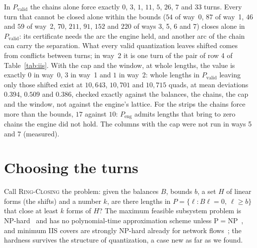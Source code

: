 \documentclass[11pt,a4paper]{article}
\newcommand{\RC}{\textup{\textsc{Ring-Closing}}}
\begin{document}
In $P_{\mathrm{valid}}$ the chains alone force exactly $0$, $3$, $1$, $11$, $5$,
$26$, $7$ and $33$ turns. Every turn that cannot be closed alone within the
bounds ($54$ of way~0, $87$ of way~1, $46$ and $59$ of way~2, $70$, $211$,
$91$, $152$ and $220$ of ways 3, 5, 6 and 7) closes alone in
$P_{\mathrm{valid}}$: its certificate needs the arc the engine held, and
another arc of the chain can carry the separation. What every valid
quantization leaves shifted comes from conflicts between turns; in way~2 it is
one turn of the pair of row 4 of Table~\ref{tab:iis}. With the cap and the
window, at whole lengths, the value is exactly $0$ in way~0, $3$ in way~1 and
$1$ in way~2: whole lengths in $P_{\mathrm{valid}}$ leaving only those shifted
exist at $10{,}643$, $10{,}701$ and $10{,}715$ quads, at mean deviations
$0.394$, $0.509$ and $0.386$, checked exactly against the balances, the
chains, the cap and the window, not against the engine's lattice. For the
strips the chains force more than the bounds, $17$ against $10$:
$P_{\mathrm{eng}}$ admits lengths that bring to zero chains the engine did not
hold. The columns with the cap were not run in ways 5 and 7 (measured).

\section{Choosing the turns}\label{sec:choosing}

Call \RC{} the problem: given the balances $B$, bounds $b$, a set $H$ of
linear forms (the shifts) and a number $k$, are there lengths in $P = \{\ell :
B\ell = 0,\ \ell \ge b\}$ that close at least $k$ forms of $H$? The maximum
feasible subsystem problem is NP-hard~\cite[\S1]{amaldi2003maxfs} and has no
polynomial-time approximation scheme unless
P${}={}$NP~\cite{amaldi1995complexity}, and minimum IIS covers are strongly
NP-hard already for network flows~\cite{joormann2015flowiis}; the hardness
survives the structure of quantization, a case new as far as we found.
\end{document}

